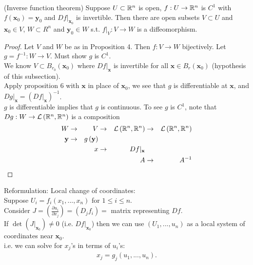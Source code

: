 \documentclass[a4paper]{article}
\begin{document}
\begin{thm} (Inverse function theorem)
Suppose  $U \subset \mathbb{R}^n$ is open, $f:U \to \mathbb{R}^n$ is $C^1$ with $f\left(\mathbf{x}_0\right) = \mathbf{y}_0$ and $Df|_{\mathbf{x}_0}$ is invertible. Then there are open subsets $V \subset U$ and $\mathbf{x}_0 \in V$, $W \subset R^n$ and $\mathbf{y}_0 \in W$ s.t. $f|_V : V \to W$ is a diffeomorphism. 
\begin{proof}
Let $V$ and $W$ be as in Proposition 4. Then $f:V \to W$ bijectively. Let $g=f^{-1}: W \to V$. Must show $g$ is $C^1$.\\
We know $V \subset B_{r_0} \left(\mathbf{x}_0\right)$ where $Df|_\mathbf{x}$ is invertible for all $\mathbf{x} \in B_r\left(\mathbf{x}_0\right)$ (hypothesis of this subsection).\\
Apply proposition 6 with $\mathbf{x}$ in place of $\mathbf{x}_0$, we see that $g$ is differentiable at $\mathbf{x}$, and $Dg|_\mathbf{x} = \left(Df|_\mathbf{x}\right)^{-1}$.\\
$g$ is differentiable implies that $g$ is continuous. To see $g$ is $C^1$, note that $Dg: W \to \mathcal{L}\left(\mathbb{R}^n,\mathbb{R}^n\right)$ is a composition
\begin{equation*}
\begin{aligned}
W &\to &V &\to &\mathcal{L}\left(\mathbb{R}^n,\mathbb{R}^n\right) &\to &\mathcal{L}\left(\mathbb{R}^n,\mathbb{R}^n\right)\\
\mathbf{y} &\to &g\left(\mathbf{y}\right) & & & &\\
& &x &\to &Df|_\mathbf{x} & &\\
& & & &A &\to &A^{-1} 
\end{aligned}
\end{equation*}
\end{proof}
\end{thm}

Reformulation: Local change of coordinates:\\
Suppose $U_i = f_i\left(x_1,...,x_n\right)$ for $1\leq i \leq n$.\\
Consider $J = \left(\frac{\partial u_i}{\partial x_j}\right) = \left(D_j f_i\right) = $ matrix representing $Df$.\\
If $\det \left(J|_{\mathbf{x}_0}\right) \neq 0$ (i.e. $Df|_{\mathbf{x}_0}$) then we can use $\left(U_1,...,u_n\right)$ as a local system of coordinates near $\mathbf{x}_0$.\\
i.e. we can solve for $x_j$'s in terms of $u_i$'s:
\begin{equation*}
\begin{aligned}
x_j = g_j\left(u_1,...,u_n\right).
\end{aligned}
\end{equation*}
\end{document}
